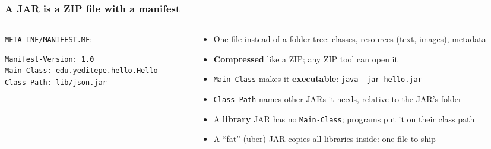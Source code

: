 \documentclass[aspectratio=169,10pt,compress]{beamer}
\begin{document}
\begin{frame}[t,fragile] \frametitle{A JAR is a ZIP file with a manifest}
  \begin{columns}[T]
    \begin{column}{0.46\textwidth}
      \vspace{0.3em}

      \small \texttt{META-INF/MANIFEST.MF}:


\begin{lstlisting}[style=codesnippet, language={}, basicstyle=\ttfamily\scriptsize]
Manifest-Version: 1.0
Main-Class: edu.yeditepe.hello.Hello
Class-Path: lib/json.jar
\end{lstlisting}


    \end{column}
    \begin{column}{0.5\textwidth}
      \begin{itemize}\small
        \item One file instead of a folder tree: classes, resources (text, images), metadata
        \item \textbf{Compressed} like a ZIP; any ZIP tool can open it
        \item \texttt{Main-Class} makes it \textbf{executable}: \texttt{java -jar hello.jar}
        \item \texttt{Class-Path} names other JARs it needs, relative to the JAR's folder
        \item A \textbf{library} JAR has no \texttt{Main-Class}; programs put it on their class path
        \item A ``fat'' (uber) JAR copies all libraries inside: one file to ship
      \end{itemize}
    \end{column}
  \end{columns}
\end{frame}
\end{document}
